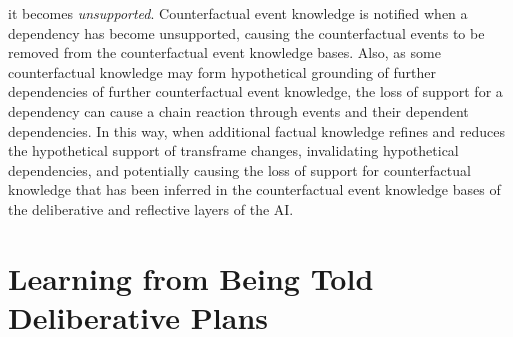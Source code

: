 it becomes \emph{unsupported}.  Counterfactual event knowledge is
notified when a dependency has become unsupported, causing the
counterfactual events to be removed from the counterfactual event
knowledge bases.  Also, as some counterfactual knowledge may form
hypothetical grounding of further dependencies of further
counterfactual event knowledge, the loss of support for a dependency
can cause a chain reaction through events and their dependent
dependencies.  In this way, when additional factual knowledge refines
and reduces the hypothetical support of transframe changes,
invalidating hypothetical dependencies, and potentially causing the
loss of support for counterfactual knowledge that has been inferred in
the counterfactual event knowledge bases of the deliberative and
reflective layers of the AI.

\section{Learning from Being Told Deliberative Plans}

